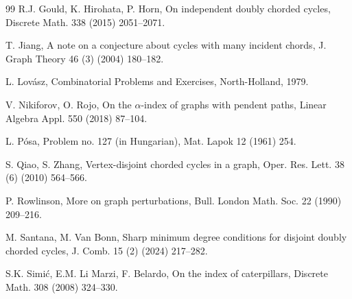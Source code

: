 \documentclass[12pt]{article}
\begin{document}
\begin{thebibliography}{99}
 R.J. Gould, K. Hirohata, P. Horn,
On independent doubly chorded cycles,
Discrete Math. 338 (2015) 2051--2071.

 T. Jiang,
A note on a conjecture about cycles with many incident chords,
J. Graph Theory 46 (3) (2004) 180--182.


 L. Lov\'asz,
 Combinatorial Problems and Exercises, North-Holland, 1979.



%


V. Nikiforov, O. Rojo, On the $\alpha$-index of graphs with pendent paths, Linear Algebra Appl. 550 (2018) 87--104.


L. P\'osa, Problem no. 127 (in Hungarian), Mat. Lapok 12 (1961) 254.


S. Qiao, S. Zhang,
Vertex-disjoint chorded cycles in a graph,
Oper. Res. Lett. 38 (6) (2010) 564--566.




P. Rowlinson, More on graph perturbations, Bull. London Math. Soc. 22 (1990) 209--216.

M. Santana, M. Van Bonn,
Sharp minimum degree conditions for disjoint doubly chorded cycles,
J. Comb. 15 (2) (2024) 217--282.

S.K. Simi\'c, E.M. Li Marzi, F. Belardo,
On the index of caterpillars, Discrete Math. 308 (2008) 324--330.


\end{thebibliography}
\end{document}
